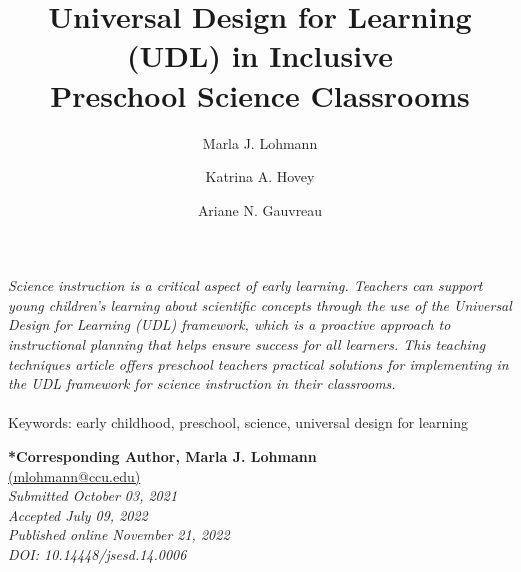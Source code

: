\documentclass[11.5pt]{sig-alternate}
\makeatletter
\let\oldabstract\abstract
\let\oldendabstract\endabstract
\renewenvironment{abstract}
{\renewenvironment{quotation}%
               {\list{}{\addtolength{\leftmargin}{1em} %
                        \listparindent 1.5em%
                        \itemindent    \listparindent%
                        \rightmargin   \leftmargin%
                        \parsep        \z@ \@plus\p@}%
                \item\relax}%
               {\endlist}%
\oldabstract}
{\oldendabstract}
\makeatother
\begin{document}
\title{Universal Design for Learning (UDL) in Inclusive \\Preschool Science Classrooms}

\author[1]{\large \color{blue} Marla J. Lohmann}
\author[2]{\large \color{blue} Katrina A. Hovey}
\author[3]{\large \color{blue}   Ariane N. Gauvreau}


\toappear{}

\maketitle


\begin{@twocolumnfalse} 

\begin{abstract}
\item 
     \textit{Science instruction is a critical aspect of early learning. Teachers can support young children’s learning about scientific concepts through the use of the Universal Design for Learning (UDL) framework, which is a proactive approach to instructional planning that helps ensure success for all learners. 
     This teaching techniques article offers preschool teachers practical solutions for implementing in the UDL framework for science instruction in their classrooms.}
     \\
     \\
     Keywords: early childhood, preschool, science, universal design for learning\\
\end{abstract}

\end{@twocolumnfalse}

\textbf{*Corresponding Author, Marla J. Lohmann} \\
\href{mailto:mlohmann@ccu.edu}{(mlohmann@ccu.edu)} \\
\textit{Submitted October 03, 2021 }\\
\textit{Accepted July 09, 2022} \\
\textit{Published online November 21, 2022} \\
\textit{DOI: 10.14448/jsesd.14.0006} \\
\pagebreak
\pagebreak

\vspace{5mm}
\section*{\vspace{140mm}}
\end{document}
